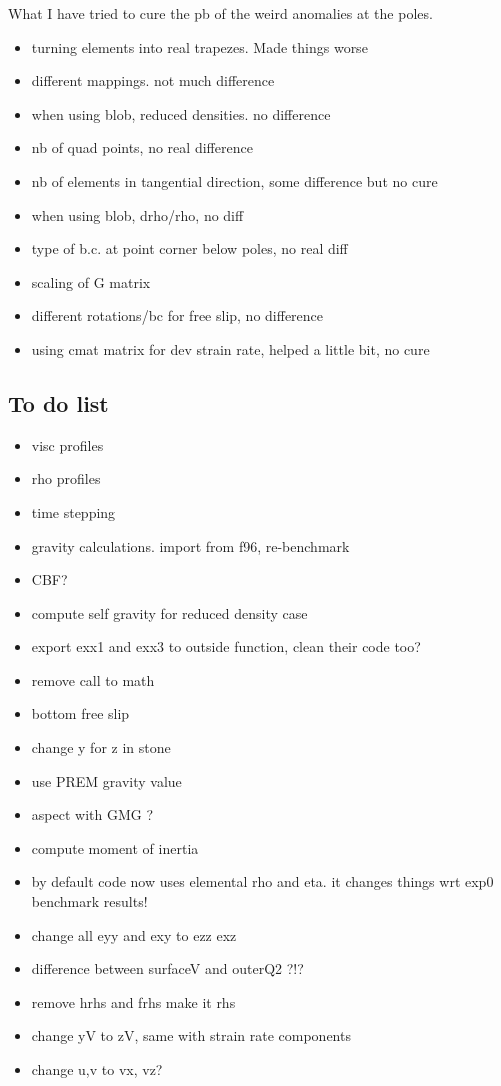 \documentclass[a4paper,12pt]{article}
\begin{document}
What I have tried to cure the pb of the weird anomalies at the poles.

\begin{itemize}
\item turning elements into real trapezes. Made things worse
\item different mappings. not much difference
\item when using blob, reduced densities. no difference
\item nb of quad points, no real difference
\item nb of elements in tangential direction, some difference but no cure 
\item when using blob, drho/rho, no diff 
\item type of b.c. at point corner below poles, no real diff 
\item scaling of G matrix
\item different rotations/bc for free slip, no difference
\item using cmat matrix for dev strain rate, helped a little bit, no cure 
\end{itemize}



\subsection{To do list}
\begin{itemize}
\item visc profiles
\item rho profiles
\item time stepping
\item gravity calculations. import from f96, re-benchmark
\item CBF? 
\item compute self gravity for reduced density case 
\item export exx1 and exx3 to outside function, clean their code too? 
\item remove call to math 
\item bottom free slip 
\item change y for z in stone
\item use PREM gravity value
\item aspect with GMG ?
\item compute moment of inertia
\item by default code now uses elemental rho and eta. it changes things wrt exp0 benchmark results!
\item change all eyy and exy to ezz exz
\item difference between surfaceV and outerQ2 ?!?
\item remove hrhs and frhs make it rhs
\item change yV to zV, same with strain rate components
\item change u,v to vx, vz?
\end{itemize}



\printbibliography
\end{document}
